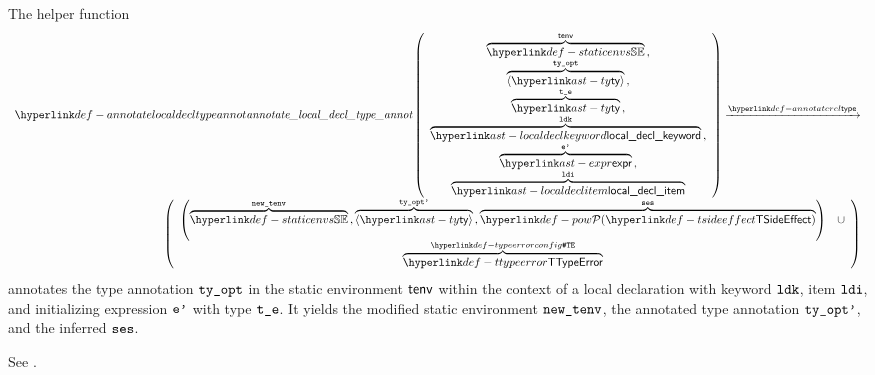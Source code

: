\hypertarget{def-annotatelocaldecltypeannot}{}
The helper function
\[
\begin{array}{r}
  \annotatelocaldecltypeannot
  \left(
  \begin{array}{c}
    \overname{\staticenvs}{\tenv} \aslsep \\
    \overname{\langle\ty\rangle}{\tyopt} \aslsep \\
    \overname{\ty}{\vte} \aslsep \\
    \overname{\localdeclkeyword}{\ldk} \aslsep \\
    \overname{\expr}{\vep} \aslsep\\
    \overname{\localdeclitem}{\ldi}
  \end{array}
  \right)
  \typearrow \\
  \left(
  \begin{array}{cl}
    \left(\overname{\staticenvs}{\newtenv} \aslsep \overname{\langle\ty\rangle}{\tyoptp} \aslsep \overname{\TSideEffectSet}{\vses}\right)
    & \cup \\
    \overname{\TTypeError}{\TypeErrorConfig} &
  \end{array}
  \right)
\end{array}
\]
annotates the type annotation $\texttt{ty\_opt}$ in the static environment $\textsf{tenv}$ within the context of a local declaration with keyword $\texttt{ldk}$, item $\texttt{ldi}$, and initializing expression $\texttt{e'}$ with type $\texttt{t\_e}$.
It yields the modified static environment $\texttt{new\_tenv}$, the annotated type annotation $\texttt{ty\_opt'}$, and the inferred \sideeffectsetterm{} $\texttt{ses}$.
\ProseOtherwiseTypeError

See .

